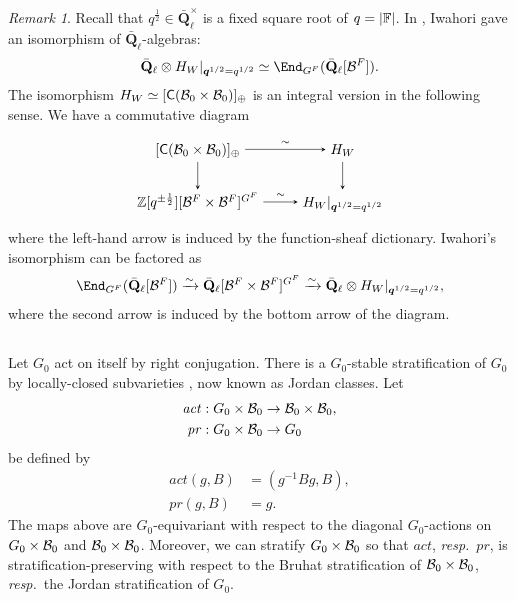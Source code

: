 \documentclass[a4paper,10pt,leqno]{amsart}
\theoremstyle{plain}
\theoremstyle{plain}
\theoremstyle{plain}
\theoremstyle{definition}
\theoremstyle{remark}
\newtheorem{rem}[thm]{Remark}
\newcommand{\Q}{\bm{q}}
\newcommand{\QL}{\bar{\mathbf{Q}}_\ell}
\newcommand{\act}{\mathit{act}}
\renewcommand{\pr}{\mathit{pr}}
\begin{document}
\begin{rem}\label{rem:iwahori}
Recall that $q^{\frac{1}{2}} \in \QL^\times$ is a fixed square root of $q = |\bb{F}|$.
In \cite{iwahori}, Iwahori gave an isomorphism of $\QL$-algebras:
\begin{align}\label{eq:iwahori}
\QL \otimes H_W|_{\Q^{1/2} = q^{1/2}} \simeq \End_{G^F}(\QL[\cal{B}^F]).
\end{align}
The isomorphism $H_W \simeq [\sf{C}(\cal{B}_0 \times \cal{B}_0)]_\oplus$ is an integral version in the following sense.
We have a commutative diagram
\begin{equation}
\begin{tikzpicture}[baseline=(current bounding box.center), >=stealth]
\matrix(m)[matrix of math nodes, row sep=2em, column sep=2.5em, text height=2ex, text depth=0.5ex]
{	{[\sf{C}(\cal{B}_0 \times \cal{B}_0)]_\oplus}
		&H_W\\
	\bb{Z}[q^{\pm\frac{1}{2}}][\cal{B}^F \times \cal{B}^F]^{G^F}
		&H_W|_{\Q^{1/2} = q^{1/2}}\\
		};
\path[->,font=\scriptsize, auto]
(m-1-1)		edge node{$\sim$}(m-1-2)
(m-1-1)		edge (m-2-1)
(m-1-2)		edge (m-2-2)
(m-2-1)		edge node{$\sim$} (m-2-2);
\end{tikzpicture}
\end{equation}
where the left-hand arrow is induced by the function-sheaf dictionary.
Iwahori's isomorphism can be factored as
\begin{align}
\End_{G^F}(\QL[\cal{B}^F]) \xrightarrow{\sim} \QL[\cal{B}^F \times \cal{B}^F]^{G^F} \xrightarrow{\sim} \QL \otimes H_W|_{\Q^{1/2} = q^{1/2}},
\end{align}
where the second arrow is induced by the bottom arrow of the diagram.
\end{rem}

\subsection{}

Let $G_0$ act on itself by right conjugation.
There is a $G_0$-stable stratification of $G_0$ by locally-closed subvarieties \cite[\S{3.1}]{lusztig_1984_intersection} \cite[\S{3.11}]{lusztig_1985_1}, now known as Jordan classes.
Let 
\begin{align}
\act : G_0 \times \cal{B}_0 &\to \cal{B}_0 \times \cal{B}_0,\\
\pr : G_0 \times \cal{B}_0 &\to G_0
\end{align}
be defined by 
\begin{align}
\act(g, B) &= (g^{-1}Bg, B),\\
\pr(g, B) &= g.
\end{align}
The maps above are $G_0$-equivariant with respect to the diagonal $G_0$-actions on $G_0 \times \cal{B}_0$ and $\cal{B}_0 \times \cal{B}_0$.
Moreover, we can stratify $G_0 \times \cal{B}_0$ so that $\act$, \emph{resp.}\ $\pr$, is stratification-preserving with respect to the Bruhat stratification of $\cal{B}_0 \times \cal{B}_0$, \emph{resp.}\ the Jordan stratification of $G_0$.
\end{document}
